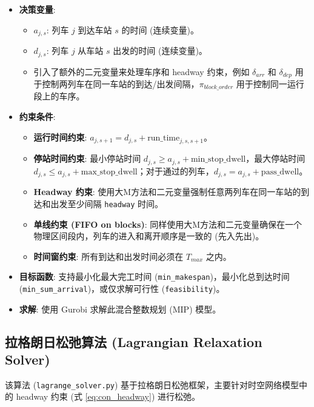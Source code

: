 \documentclass{article}
\begin{document}
\begin{itemize}
    \item \textbf{决策变量}:
        \begin{itemize}
            \item $a_{j,s}$: 列车 $j$ 到达车站 $s$ 的时间 (连续变量)。
            \item $d_{j,s}$: 列车 $j$ 从车站 $s$ 出发的时间 (连续变量)。
            \item 引入了额外的二元变量来处理车序和 headway 约束，例如 $\delta_{arr}$ 和
                $\delta_{dep}$
                用于控制两列车在同一车站的到达/出发间隔，$\pi_{block\_order}$ 用于控制同一运行段上的车序。
        \end{itemize}
    \item \textbf{约束条件}:
        \begin{itemize}
            \item \textbf{运行时间约束}: $a_{j,s+1} = d_{j,s} +
                \text{run\_time}_{j,s,s+1}$。
            \item \textbf{停站时间约束}: 最小停站时间 $d_{j,s} \ge a_{j,s} +
                \text{min\_stop\_dwell}$，最大停站时间 $d_{j,s} \le a_{j,s}
                + \text{max\_stop\_dwell}$；对于通过的列车，$d_{j,s} = a_{j,s}
                + \text{pass\_dwell}$。
            \item \textbf{Headway 约束}:
                使用大M方法和二元变量强制任意两列车在同一车站的到达和出发至少间隔 \texttt{headway} 时间。
            \item \textbf{单线约束 (FIFO on blocks)}:
                同样使用大M方法和二元变量确保在一个物理区间段内，列车的进入和离开顺序是一致的 (先入先出)。
            \item \textbf{时间窗约束}: 所有到达和出发时间必须在 $T_{max}$ 之内。
        \end{itemize}
    \item \textbf{目标函数}: 支持最小化最大完工时间
        (\texttt{min\_makespan})，最小化总到达时间
        (\texttt{min\_sum\_arrival})，或仅求解可行性 (\texttt{feasibility})。
    \item \textbf{求解}: 使用 Gurobi 求解此混合整数规划 (MIP) 模型。
\end{itemize}

\subsection{拉格朗日松弛算法 (Lagrangian Relaxation Solver)}
该算法 (\texttt{lagrange\_solver.py}) 基于拉格朗日松弛框架，主要针对时空网络模型中的 headway 约束
(式 \ref{eq:con_headway}) 进行松弛。
\end{document}
